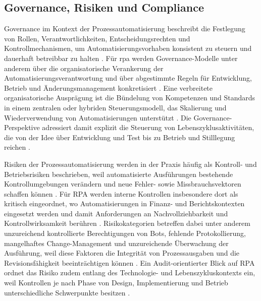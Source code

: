 \subsection{Governance, Risiken und Compliance}
Governance im Kontext der Prozessautomatisierung beschreibt die Festlegung von Rollen, Verantwortlichkeiten, Entscheidungsrechten und Kontrollmechanismen, um Automatisierungsvorhaben konsistent zu steuern und dauerhaft betreibbar zu halten \cite{Kedziora2021GovernanceModelsRPA}. 
Für \gls{rpa} werden Governance-Modelle unter anderem über die organisatorische Verankerung der Automatisierungsverantwortung und über abgestimmte Regeln für Entwicklung, Betrieb und Änderungsmanagement konkretisiert \cite{Kedziora2021GovernanceModelsRPA}. 
Eine verbreitete organisatorische Ausprägung ist die Bündelung von Kompetenzen und Standards in einem zentralen oder hybriden Steuerungsmodell, das Skalierung und Wiederverwendung von Automatisierungen unterstützt \cite{Kedziora2021GovernanceModelsRPA}. 
Die Governance-Perspektive adressiert damit explizit die Steuerung von Lebenszyklusaktivitäten, die von der Idee über Entwicklung und Test bis zu Betrieb und Stilllegung reichen \cite{Patricio2025AuditFrameworkRPA}. 

Risiken der Prozessautomatisierung werden in der Praxis häufig als Kontroll- und Betriebsrisiken beschrieben, weil automatisierte Ausführungen bestehende Kontrollumgebungen verändern und neue Fehler- sowie Missbrauchsvektoren schaffen können \cite{COSO2025RPAICIF}. 
Für RPA werden interne Kontrollen insbesondere dort als kritisch eingeordnet, wo Automatisierungen in Finanz- und Berichtskontexten eingesetzt werden und damit Anforderungen an Nachvollziehbarkeit und Kontrollwirksamkeit berühren \cite{Kokina2024RPAGovernanceJIS,AAA2024RPAAccountingRiskIC}. 
Risikokategorien betreffen dabei unter anderem unzureichend kontrollierte Berechtigungen von Bots, fehlende Protokollierung, mangelhaftes Change-Management und unzureichende Überwachung der Ausführung, weil diese Faktoren die Integrität von Prozessausgaben und die Revisionsfähigkeit beeinträchtigen können \cite{COSO2025RPAICIF,Kokina2024RPAGovernanceJIS}. 
Ein Audit-orientierter Blick auf RPA ordnet das Risiko zudem entlang des Technologie- und Lebenszykluskontexts ein, weil Kontrollen je nach Phase von Design, Implementierung und Betrieb unterschiedliche Schwerpunkte besitzen \cite{Patricio2025AuditFrameworkRPA}. 

